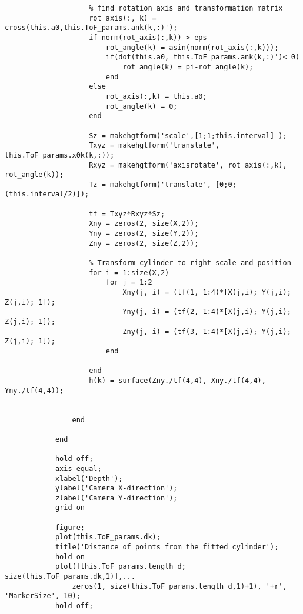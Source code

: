 \begin{lstlisting}
                    % find rotation axis and transformation matrix
                    rot_axis(:, k) = cross(this.a0,this.ToF_params.ank(k,:)');
                    if norm(rot_axis(:,k)) > eps
                        rot_angle(k) = asin(norm(rot_axis(:,k)));
                        if(dot(this.a0, this.ToF_params.ank(k,:)')< 0)
                            rot_angle(k) = pi-rot_angle(k);
                        end
                    else
                        rot_axis(:,k) = this.a0;
                        rot_angle(k) = 0;
                    end
                    
                    Sz = makehgtform('scale',[1;1;this.interval] );
                    Txyz = makehgtform('translate', this.ToF_params.x0k(k,:));
                    Rxyz = makehgtform('axisrotate', rot_axis(:,k), rot_angle(k));
                    Tz = makehgtform('translate', [0;0;-(this.interval/2)]);
                    
                    tf = Txyz*Rxyz*Sz;
                    Xny = zeros(2, size(X,2));
                    Yny = zeros(2, size(Y,2));
                    Zny = zeros(2, size(Z,2));
                    
                    % Transform cylinder to right scale and position
                    for i = 1:size(X,2)
                        for j = 1:2
                            Xny(j, i) = (tf(1, 1:4)*[X(j,i); Y(j,i); Z(j,i); 1]);
                            Yny(j, i) = (tf(2, 1:4)*[X(j,i); Y(j,i); Z(j,i); 1]);
                            Zny(j, i) = (tf(3, 1:4)*[X(j,i); Y(j,i); Z(j,i); 1]);
                        end
                        
                    end
                    h(k) = surface(Zny./tf(4,4), Xny./tf(4,4), Yny./tf(4,4));
                    
                    
                end
                
            end
            
            hold off;
            axis equal;
            xlabel('Depth');
            ylabel('Camera X-direction');
            zlabel('Camera Y-direction');
            grid on
            
            figure;
            plot(this.ToF_params.dk);
            title('Distance of points from the fitted cylinder');
            hold on
            plot([this.ToF_params.length_d; size(this.ToF_params.dk,1)],...
                zeros(1, size(this.ToF_params.length_d,1)+1), '+r', 'MarkerSize', 10);
            hold off;
            

\end{lstlisting}
